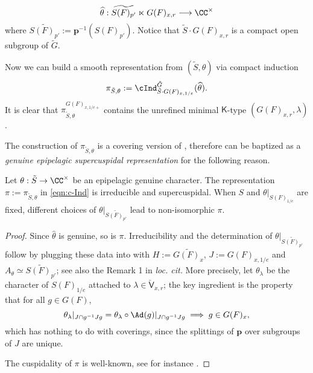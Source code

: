 \documentclass[a4paper,10pt]{article}
\begin{document}
\begin{asparaenum}[1.]
		\[ \widehat{\theta}: \widetilde{S(F)_{p'}} \ltimes G(F)_{x,r} \longrightarrow \CC^\times \]
		where $\widetilde{S(F)_{p'}} := \bm{p}^{-1}(S(F)_{p'})$. Notice that $\tilde{S} \cdot G(F)_{x,r}$ is a compact open subgroup of $\tilde{G}$.
	\item Now we can build a smooth representation from $(\tilde{S}, \theta)$ via compact induction
		\begin{equation}\label{eqn:c-Ind}
			\pi_{\tilde{S}, \theta} := \cInd^{\tilde{G}}_{\tilde{S} \cdot G(F)_{x, 1/e}} (\widehat{\theta}).
		\end{equation}
		It is clear that $\pi_{\tilde{S}, \theta}^{G(F)_{x, 1/e+}}$ contains the unrefined minimal $\mathsf{K}$-type $(G(F)_{x,r}, \lambda)$. 
\end{asparaenum}

The construction of $\pi_{\tilde{S}, \theta}$ is a covering version of \cite{RY14}, therefore can be baptized as a \emph{genuine epipelagic supercuspidal representation} for the following reason. 
\begin{theorem}\label{prop:epipelagic-supercuspidal}
	Let $\theta: \tilde{S} \to \CC^\times$ be an epipelagic genuine character. The representation $\pi := \pi_{\tilde{S}, \theta}$ in \eqref{eqn:c-Ind} is irreducible and supercuspidal. When $S$ and $\theta|_{S(F)_{1/e}}$ are fixed, different choices of $\theta|_{\widetilde{S(F)_{p'}}}$ lead to non-isomorphic $\pi$.
\end{theorem}
\begin{proof}
	Since $\widehat{\theta}$ is genuine, so is $\pi$. Irreducibility and the determination of $\theta|_{\widetilde{S(F)_{p'}}}$ follow by plugging these data into \cite[\S 2.1]{RY14} with $H := \widetilde{G(F)_x}$, $J := G(F)_{x, 1/e}$ and $A_\theta \simeq \widetilde{S(F)_{p'}}$; see also the Remark 1 in \textit{loc. cit.} More precisely, let $\theta_\lambda$ be the character of $S(F)_{1/e}$ attached to $\lambda \in \check{\mathsf{V}}_{x,r}$; the key ingredient \cite[(2.6)]{RY14} is the property that for all $g \in G(F)$,
	\[ \theta_\lambda|_{J \cap g^{-1} Jg} = \theta_\lambda \circ \Ad(g) |_{J \cap g^{-1}Jg} \implies g \in G(F)_x, \]
	which has nothing to do with coverings, since the splittings of $\bm{p}$ over subgroups of $J$ are unique.

	The cuspidality of $\pi$ is well-known, see for instance \cite[11.4]{BH06}.
\end{proof}
\end{document}

